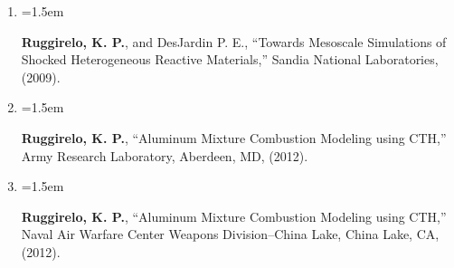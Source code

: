 \documentclass{scrartcl}
\newcommand{\MarginText}[1]{\marginpar{\raggedleft\itshape\small#1}} %
\newcommand{\Description}[1]{\hangindent=1.5em\hangafter=0\noindent\raggedright\footnotesize{#1}\par\normalsize\vspace{0.75em}} %
\newcommand{\NewTalk}[1]{\hangindent=1.5em\hangafter=0\noindent\raggedright\footnotesize{#1}\par\normalsize\vspace{0.em}} %
\begin{document}
\begin{cv}{}
\begin{mdframed}[
  linecolor=white,%
  leftmargin =-0cm,
  rightmargin =+0cm,
]
\begin{enumerate}
\item\NewTalk{\textbf{Ruggirelo, K. P.}, and DesJardin P. E., ``Towards Mesoscale Simulations of Shocked Heterogeneous Reactive Materials,'' Sandia National Laboratories, (2009).}

\item\NewTalk{\textbf{Ruggirelo, K. P.}, ``Aluminum Mixture Combustion Modeling using CTH,'' Army Research Laboratory, Aberdeen, MD, (2012).}

\item\NewTalk{\textbf{Ruggirelo, K. P.}, ``Aluminum Mixture Combustion Modeling using CTH,'' Naval Air Warfare Center Weapons Division–China Lake, China Lake, CA, (2012).}
\end{enumerate}

\end{mdframed}













\end{cv}
\end{document}

